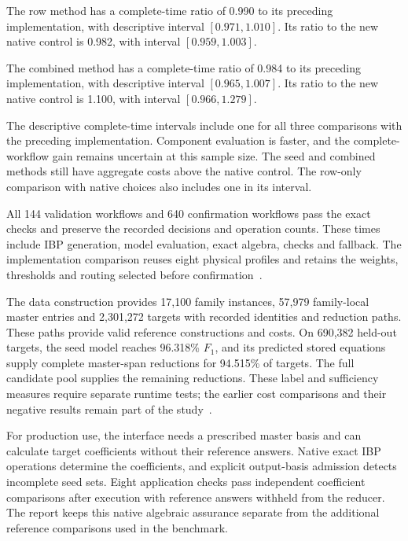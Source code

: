 \documentclass[11pt,a4paper]{article}
\begin{document}
The row method has a complete-time ratio of 0.990 to its preceding implementation, with descriptive interval $[0.971,1.010]$. Its ratio to the new native control is 0.982, with interval $[0.959,1.003]$.

The combined method has a complete-time ratio of 0.984 to its preceding implementation, with descriptive interval $[0.965,1.007]$. Its ratio to the new native control is 1.100, with interval $[0.966,1.279]$.

The descriptive complete-time intervals include one for all three comparisons with the preceding implementation. Component evaluation is faster, and the complete-workflow gain remains uncertain at this sample size. The seed and combined methods still have aggregate costs above the native control. The row-only comparison with native choices also includes one in its interval.

All 144 validation workflows and 640 confirmation workflows pass the exact
checks and preserve the recorded decisions and operation counts. These times
include IBP generation, model evaluation, exact algebra, checks and fallback.
The implementation comparison reuses eight physical
profiles and retains the weights, thresholds and routing selected before
confirmation~\cite{KiraParallelInferenceData}.


The data construction provides 17,100 family instances, 57,979 family-local
master entries and 2,301,272 targets with recorded identities and reduction
paths. These paths provide valid reference constructions and costs.
On 690,382 held-out targets, the seed model reaches 96.318\% $F_1$, and its
predicted stored equations supply complete master-span reductions for
94.515\% of targets. The full candidate pool supplies the remaining reductions.
These label and sufficiency measures require separate runtime tests; the
earlier cost comparisons and their negative results remain part of the
study~\cite{HigherLoopIntegralData,SeedModelTestData,KiraSeedSufficiencyData,KiraCostComparisonData}.

For production use, the interface needs a prescribed master basis and can
calculate target coefficients without their reference answers. Native exact
IBP operations determine the coefficients, and explicit output-basis admission
detects incomplete seed sets. Eight application checks pass independent
coefficient comparisons after execution with reference answers withheld
from the reducer. The report keeps this native algebraic assurance separate
from the additional reference comparisons used in the benchmark.
\end{document}
